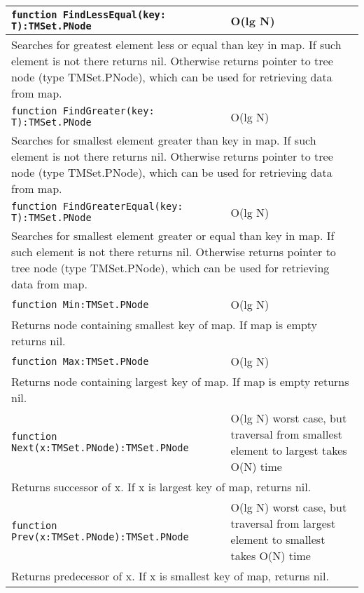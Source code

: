 \begin{longtable}{|m{10cm}|m{5cm}|}
\verb!function FindLessEqual(key: T):TMSet.PNode! & O(lg N) \\\hline
\multicolumn{2}{|m{15cm}|}{Searches for greatest element less or equal than key in map. If such element is not there returns nil. Otherwise
returns pointer to tree node (type TMSet.PNode), which can be used for retrieving data from map.} \\\hline\hline

\verb!function FindGreater(key: T):TMSet.PNode! & O(lg N) \\\hline
\multicolumn{2}{|m{15cm}|}{Searches for smallest element greater than key in map. If such element is not there returns nil. Otherwise
returns pointer to tree node (type TMSet.PNode), which can be used for retrieving data from map.} \\\hline\hline

\verb!function FindGreaterEqual(key: T):TMSet.PNode! & O(lg N) \\\hline
\multicolumn{2}{|m{15cm}|}{Searches for smallest element greater or equal than key in map. If such element is not there returns nil. Otherwise
returns pointer to tree node (type TMSet.PNode), which can be used for retrieving data from map.} \\\hline\hline

\verb!function Min:TMSet.PNode! & O(lg N) \\\hline
\multicolumn{2}{|m{15cm}|}{Returns node containing smallest key of map. If map is empty returns
nil.} \\\hline\hline

\verb!function Max:TMSet.PNode! & O(lg N) \\\hline
\multicolumn{2}{|m{15cm}|}{Returns node containing largest key of map. If map is empty returns
nil.} \\\hline\hline

\verb!function Next(x:TMSet.PNode):TMSet.PNode! & O(lg N) worst case, but traversal from smallest element to
largest takes O(N) time \\\hline
\multicolumn{2}{|m{15cm}|}{Returns successor of x. If x is largest key of map, returns nil.} \\\hline\hline

\verb!function Prev(x:TMSet.PNode):TMSet.PNode! & O(lg N) worst case, but traversal from largest element to
smallest takes O(N) time \\\hline
\multicolumn{2}{|m{15cm}|}{Returns predecessor of x. If x is smallest key of map, returns nil.} \\\hline\hline


\end{longtable}
